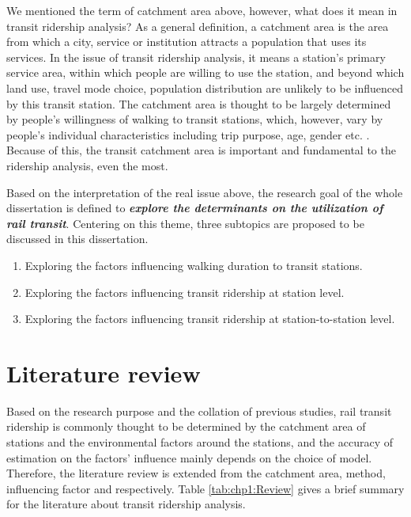 We mentioned the term of catchment area above, however, what does it mean in transit ridership analysis? As a general definition, a catchment area is the area from which a city, service or institution attracts a population that uses its services. In the issue of transit ridership analysis, it means a station's primary service area, within which people are willing to use the station, and beyond which land use, travel mode choice, population distribution are unlikely to be influenced by this transit station. The catchment area is thought to be largely determined by people's willingness of walking to transit stations, which, however, vary by people's individual characteristics including trip purpose, age, gender etc. \cite{guerra2013half}. Because of this, the transit catchment area is important and fundamental to the ridership analysis, even the most.

Based on the interpretation of the real issue above, the research goal of the whole dissertation is defined to \emph{\textbf{explore the determinants on the utilization of rail transit}}. Centering on this theme, three subtopics are proposed to be discussed in this dissertation.

\begin{enumerate}
	\setlength{\parskip}{0\baselineskip} %
	\item Exploring the factors influencing walking duration to transit stations.
	\item Exploring the factors influencing transit ridership at station level.
	\item Exploring the factors influencing transit ridership at station-to-station level.
	\setlength{\parskip}{0.7\baselineskip} %
\end{enumerate}

%
\section{Literature review} 
Based on the research purpose and the collation of previous studies, rail transit ridership is commonly thought to be determined by the catchment area of stations and the environmental factors around the stations, and the accuracy of estimation on the factors' influence mainly depends on the choice of model. Therefore, the literature review is extended from the catchment area, method, influencing factor and respectively. Table \ref{tab:chp1:Review} gives a brief summary for the literature about transit ridership analysis.

